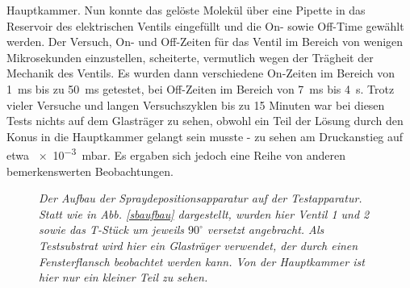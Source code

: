  Hauptkammer. Nun konnte das gelöste Molekül über eine Pipette in das Reservoir des elektrischen
 Ventils eingefüllt und die On- sowie Off-Time gewählt werden. Der Versuch, On- und Off-Zeiten für
 das Ventil im Bereich von wenigen Mikrosekunden einzustellen, scheiterte, vermutlich wegen der
 Trägheit der Mechanik des Ventils. Es wurden dann verschiedene On-Zeiten im Bereich von \SI{1}{ms}
 bis zu \SI{50}{ms} getestet, bei Off-Zeiten im Bereich von \SI{7}{ms} bis \SI{4}{s}. Trotz vieler
 Versuche und langen Versuchszyklen bis zu 15 Minuten war bei diesen Tests nichts auf dem
 Glasträger zu sehen, obwohl ein Teil der Lösung durch den Konus in die Hauptkammer gelangt
 sein musste - zu sehen am Druckanstieg auf etwa \SI{e-3}{mbar}. Es ergaben sich jedoch
 eine Reihe von anderen bemerkenswerten Beobachtungen.
 \\

 
\begin{figure}[H]
	\centering
	\sffamily
	
	\caption{\textit{Der Aufbau der Spraydepositionsapparatur auf der Testapparatur. Statt wie in Abb.
	\ref{sbaufbau} dargestellt, wurden hier Ventil 1 und 2 sowie das T-Stück um jeweils $90^{\circ}$
	versetzt angebracht. Als Testsubstrat wird hier ein Glasträger verwendet, der durch einen
	Fensterflansch beobachtet werden kann. Von der Hauptkammer ist hier nur ein kleiner Teil zu
	sehen.}}
\label{aufbau}
\end{figure}
 


